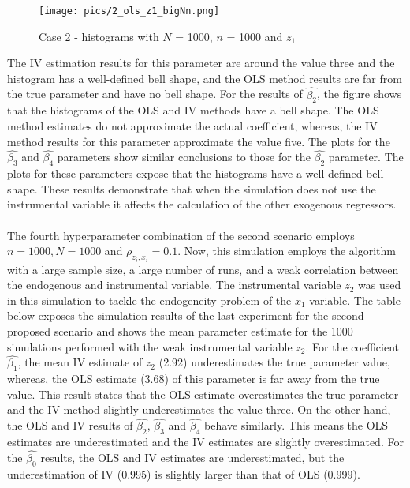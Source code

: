 \documentclass{article}
\begin{document}
\newline
\begin{figure}[h]
\centering
\texttt{[image: pics/2\_ols\_z1\_bigNn.png]}
\caption{Case 2 - histograms with $N$ = 1000, $n$ = 1000 and $z_{1}$}
\label{fig:image2}
\end{figure}
\newline
The IV estimation results for this parameter are around the value three and the histogram has a well-defined bell shape, and the OLS method results are far from the true parameter and have no bell shape. For the results of $\hat{\beta_{2}}$, the figure shows that the histograms of the OLS and IV methods have a bell shape. The OLS method estimates do not approximate the actual coefficient, whereas, the IV method results for this parameter approximate the value five. The plots for the $\hat{\beta_{3}}$ and $\hat{\beta_{4}}$ parameters show similar conclusions to those for the $\hat{\beta_{2}}$ parameter. The plots for these parameters expose that the histograms have a well-defined bell shape. These results demonstrate that when the simulation does not use the instrumental variable it affects the calculation of the other exogenous regressors.
\\~\\
The fourth hyperparameter combination of the second scenario employs $n = 1000, N = 1000$ and $\rho_{z_{i},x_{i}} = 0.1$. Now, this simulation employs the algorithm with a large sample size, a large number of runs, and a weak correlation between the endogenous and instrumental variable. The instrumental variable $z_{2}$ was used in this simulation to tackle the endogeneity problem of the $x_{1}$ variable.
\newline
The table below exposes the simulation results of the last experiment for the second proposed scenario and shows the mean parameter estimate for the 1000 simulations performed with the weak instrumental variable $z_{2}$. For the coefficient $\hat{\beta_{1}}$, the mean IV estimate of $z_{2}$ (2.92) underestimates the true parameter value, whereas, the OLS estimate (3.68) of this parameter is far away from the true value. This result states that the OLS estimate overestimates the true parameter and the IV method slightly underestimates the value three.
On the other hand, the OLS and IV results of $\hat{\beta_{2}}$, $\hat{\beta_{3}}$ and $\hat{\beta_{4}}$ behave similarly. This means the OLS estimates are underestimated and the IV estimates are slightly overestimated. For the $\hat{\beta_{0}}$ results, the OLS and IV estimates are underestimated, but the underestimation of IV (0.995) is slightly larger than that of OLS (0.999).
\end{document}
